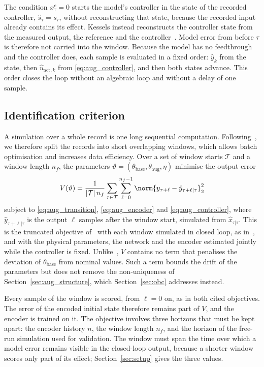 The condition $x^c_\tau=0$ starts the model's controller in the state of the
recorded controller, $\hat s_\tau=s_\tau$, without reconstructing that state,
because the recorded input already contains its effect.
Kessels instead reconstructs the controller state from the measured output,
the reference and the controller~\cite[Remark~5.4]{kessels2025ai}.
Model error from before $\tau$ is therefore not carried into the window.
Because the model has no feedthrough and the controller does, each sample is
evaluated in a fixed order: $\hat y_k$ from the state, then
$\hat u_{\mathrm{act},k}$ from \eqref{eq:aug_controller}, and then both
states advance.
This order closes the loop without an algebraic loop and without a delay of
one sample.

\subsection{Identification criterion}\label{sec:aug_objective}
A simulation over a whole record is one long sequential computation.
Following~\cite[Sec.~5.1]{hoekstra2026lfr}, we therefore split the records
into short overlapping windows, which allows batch optimisation and
increases data efficiency.
Over a set of window starts $\mathcal T$ and a window length $n_f$, the
parameters $\vartheta=(\theta_{\mathrm{base}},\theta_{\mathrm{aug}},\eta)$
minimise the output error
\begin{equation}
 V(\vartheta)=\frac{1}{|\mathcal T|\,n_f}
 \sum_{\tau\in\mathcal T}\sum_{\ell=0}^{n_f-1}
 \norm{y_{\tau+\ell}-\hat y_{\tau+\ell|\tau}}_2^2
 \label{eq:aug_loss}
\end{equation}
subject to \eqref{eq:aug_transition}, \eqref{eq:aug_encoder} and
\eqref{eq:aug_controller}, where $\hat y_{\tau+\ell|\tau}$ is the output
$\ell$ samples after the window start, simulated from
$\hat x_{\tau|\tau}$.
This is the truncated objective of~\cite[Eq.~(22)]{hoekstra2026lfr} with
each window simulated in closed loop, as in~\cite[Eq.~(5.12)]{kessels2025ai},
and with the physical parameters, the network and the encoder estimated
jointly while the controller is fixed.
Unlike~\cite[Eq.~(27)]{hoekstra2026lfr}, $V$ contains no term that
penalises the deviation of $\theta_{\mathrm{base}}$ from nominal values.
Such a term bounds the drift of the parameters but does not remove the
non-uniqueness of Section~\ref{sec:aug_structure}, which
Section~\ref{sec:obc} addresses instead.

Every sample of the window is scored, from $\ell=0$ on, as in both cited
objectives.
The error of the encoded initial state therefore remains part of $V$, and
the encoder is trained on it.
The objective involves three horizons that must be kept apart: the encoder
history $n$, the window length $n_f$, and the horizon of the free-run
simulation used for validation.
The window must span the time over which a model error remains visible in
the closed-loop output, because a shorter window scores only part of its
effect; Section~\ref{sec:setup} gives the three values.
